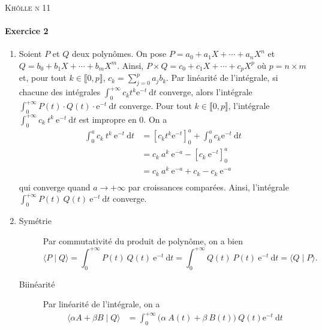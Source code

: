 \documentclass[a4paper]{article}
\let\bfseries\scshape
\begin{document}
	\begin{center}
		\bfseries\scshape\Huge Khôlle n 11
	\end{center}

	\paragraph{Exercice 2}
	\begin{enumerate}
		\item Soient $P$\/ et $Q$\/ deux polynômes. On pose $P = a_0 + a_1 X + \cdots + a_n X^n$\/ et $Q = b_0 + b_1X + \cdots + b_m X^m$.
			Ainsi, $P \times Q = c_0 + c_1 X + \cdots + c_p X^p$\/ où $p = n \times m$\/ et, pour tout $k \in \llbracket 0,p \rrbracket $, $c_k = \sum_{j=0}^p a_j b_k$.
			Par linéarité de l'intégrale, si chacune des intégrales $\int_{0}^{+\infty} c_k t^k \mathrm{e}^{-t}~\mathrm{d}t$\/ converge, alors l'intégrale $\int_{0}^{+\infty} P(t) \cdot Q(t) \cdot \mathrm{e}^{-t}~\mathrm{d}t$\/ converge.
			Pour tout $k \in \llbracket 0,p \rrbracket$, l'intégrale $\int_{0}^{+\infty} c_k\:t^k\: \mathrm{e}^{-t}~\mathrm{d}t$\/ est impropre en 0. On a
			\begin{align*}
				\int_{0}^{a} c_k\:t^k\: \mathrm{e}^{-t}~\mathrm{d}t
				&= [c_k t^k \mathrm{e}^{-t}]_0^a + \int_{0}^{a} c_k \mathrm{e}^{-t}~\mathrm{d}t \\
				&= c_k\: a^k\: \mathrm{e}^{-a} - [c_k\: \mathrm{e}^{-t}]_0^a \\
				&= c_k\:a^k\: \mathrm{e}^{-a} + c_k - c_k\: \mathrm{e}^{-a} \\
			\end{align*}
			qui converge quand $a \to +\infty$\/ par croissances comparées. Ainsi, l'intégrale $\int_{0}^{+\infty} P(t)\:Q(t)\: \mathrm{e}^{-t}~\mathrm{d}t$\/ converge.
		\item %
			\begin{description}
				\item[Symétrie] Par commutativité du produit de polynôme, on a bien \[
						\langle P \mid Q \rangle = \int_{0}^{+\infty} P(t)\:Q(t)\: \mathrm{e}^{-t}~\mathrm{d}t = \int_{0}^{+\infty} Q(t)\:P(t)\: \mathrm{e}^{-t}~\mathrm{d}t = \langle Q\mid P \rangle
					.\]
				\item[Biinéarité] Par linéarité de l'intégrale, on a
					\begin{align*}
						\langle \alpha A + \beta B  \mid Q \rangle
						&= \int_{0}^{+\infty} \big(\alpha\: A(t) + \beta\: B(t)\big)\:Q(t) \mathrm{e}^{-t}~\mathrm{d}t \\

\end{align*}
\end{description}
\end{enumerate}
\end{document}
